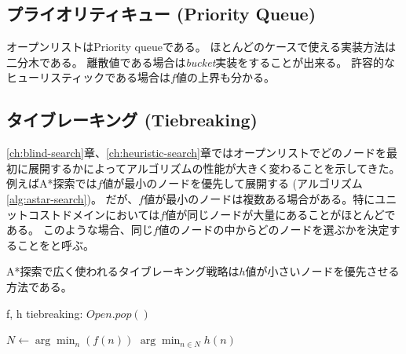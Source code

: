 
\subsection{プライオリティキュー (Priority Queue)}
\label{sec:priority-queue}

オープンリストはPriority queueである。
ほとんどのケースで使える実装方法は二分木である。
離散値である場合は{\it bucket}実装をすることが出来る。
許容的なヒューリスティックである場合は$f$値の上界も分かる。


\subsection{タイブレーキング (Tiebreaking)}
\label{sec:tiebreaking}

\ref{ch:blind-search}章、\ref{ch:heuristic-search}章ではオープンリストでどのノードを最初に展開するかによってアルゴリズムの性能が大きく変わることを示してきた。
例えばA*探索では$f$値が最小のノードを優先して展開する (アルゴリズム\ref{alg:astar-search})。
だが、$f$値が最小のノードは複数ある場合がある。特にユニットコストドメインにおいては$f$値が同じノードが大量にあることがほとんどである。
このような場合、同じ$f$値のノードの中からどのノードを選ぶかを決定することをと呼ぶ。

A*探索で広く使われるタイブレーキング戦略は$h$値が小さいノードを優先させる方法である。

\begin{algorithm}
\caption{f, h tiebreaking: $Open.pop()$}
\label{alg:f-h-tiebreaking}
	$N \leftarrow \arg \min_n (f(n))$
	\Return $\arg \min_{n \in N} h(n)$
\end{algorithm}

